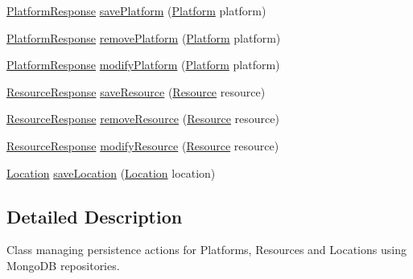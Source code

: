 \begin{DoxyCompactItemize}
\item 
\hyperlink{classeu_1_1h2020_1_1symbiote_1_1model_1_1PlatformResponse}{Platform\+Response} \hyperlink{classeu_1_1h2020_1_1symbiote_1_1repository_1_1RepositoryManager_a4b0ab3911577e2b2577390e9c0566564}{save\+Platform} (\hyperlink{classeu_1_1h2020_1_1symbiote_1_1model_1_1Platform}{Platform} platform)
\item 
\hyperlink{classeu_1_1h2020_1_1symbiote_1_1model_1_1PlatformResponse}{Platform\+Response} \hyperlink{classeu_1_1h2020_1_1symbiote_1_1repository_1_1RepositoryManager_a3040700dcc9c91da9770fc2c5a96cdd1}{remove\+Platform} (\hyperlink{classeu_1_1h2020_1_1symbiote_1_1model_1_1Platform}{Platform} platform)
\item 
\hyperlink{classeu_1_1h2020_1_1symbiote_1_1model_1_1PlatformResponse}{Platform\+Response} \hyperlink{classeu_1_1h2020_1_1symbiote_1_1repository_1_1RepositoryManager_aeb1e54e87272c6a36188a75ee984d6f4}{modify\+Platform} (\hyperlink{classeu_1_1h2020_1_1symbiote_1_1model_1_1Platform}{Platform} platform)
\item 
\hyperlink{classeu_1_1h2020_1_1symbiote_1_1model_1_1ResourceResponse}{Resource\+Response} \hyperlink{classeu_1_1h2020_1_1symbiote_1_1repository_1_1RepositoryManager_a28f5700428aaffef548549bbccc6672b}{save\+Resource} (\hyperlink{classeu_1_1h2020_1_1symbiote_1_1model_1_1Resource}{Resource} resource)
\item 
\hyperlink{classeu_1_1h2020_1_1symbiote_1_1model_1_1ResourceResponse}{Resource\+Response} \hyperlink{classeu_1_1h2020_1_1symbiote_1_1repository_1_1RepositoryManager_ae2b1a848ec4bc02164d652a910550cc6}{remove\+Resource} (\hyperlink{classeu_1_1h2020_1_1symbiote_1_1model_1_1Resource}{Resource} resource)
\item 
\hyperlink{classeu_1_1h2020_1_1symbiote_1_1model_1_1ResourceResponse}{Resource\+Response} \hyperlink{classeu_1_1h2020_1_1symbiote_1_1repository_1_1RepositoryManager_aa501f5c6448048328ab71d7a9316f4a7}{modify\+Resource} (\hyperlink{classeu_1_1h2020_1_1symbiote_1_1model_1_1Resource}{Resource} resource)
\item 
\hyperlink{classeu_1_1h2020_1_1symbiote_1_1model_1_1Location}{Location} \hyperlink{classeu_1_1h2020_1_1symbiote_1_1repository_1_1RepositoryManager_ab019d153486c163e20cdaa7eaa39c4c0}{save\+Location} (\hyperlink{classeu_1_1h2020_1_1symbiote_1_1model_1_1Location}{Location} location)
\end{DoxyCompactItemize}


\subsection{Detailed Description}
Class managing persistence actions for Platforms, Resources and Locations using Mongo\+DB repositories. 

